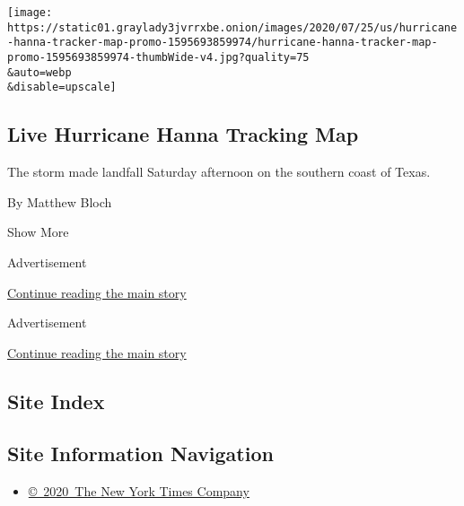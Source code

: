 \begin{enumerate}
  \texttt{[image: https://static01.graylady3jvrrxbe.onion/images/2020/07/25/us/hurricane-hanna-tracker-map-promo-1595693859974/hurricane-hanna-tracker-map-promo-1595693859974-thumbWide-v4.jpg?quality=75\\\&auto=webp\\\&disable=upscale]}

  \hypertarget{live-hurricane-hanna-tracking-map}{%
  \subsection{Live Hurricane Hanna Tracking
  Map}\label{live-hurricane-hanna-tracking-map}}

  The storm made landfall Saturday afternoon on the southern coast of
  Texas.

  By Matthew Bloch
\end{enumerate}

Show More

Advertisement

\protect\hyperlink{after-mid2}{Continue reading the main story}

Advertisement

\protect\hyperlink{after-mktg}{Continue reading the main story}

\hypertarget{site-index}{%
\subsection{Site Index}\label{site-index}}

\hypertarget{site-information-navigation}{%
\subsection{Site Information
Navigation}\label{site-information-navigation}}

\begin{itemize}
\tightlist
\item
  \href{https://help.nytimes3xbfgragh.onion/hc/en-us/articles/115014792127-Copyright-notice}{©~2020~The
  New York Times Company}
\end{itemize}


